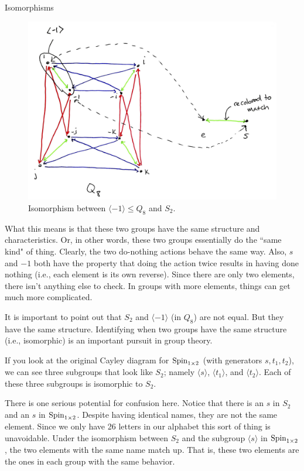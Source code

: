 \begin{section}{Isomorphisms}
\begin{figure}\label{fig:isoS2}
\begin{center}
\includegraphics[width=5in]{isoS2.png}
\end{center}
\caption{Isomorphism between $\langle -1\rangle\leq Q_8$ and $S_2$.}
\end{figure}

What this means is that these two groups have the same structure and characteristics.  Or, in other words, these two groups essentially do the ``same kind" of thing.  Clearly, the two do-nothing actions behave the same way.  Also, $s$ and $-1$ both have the property that doing the action twice results in having done nothing (i.e., each element is its own reverse).  Since there are only two elements, there isn't anything else to check.  In groups with more elements, things can get much more complicated.  

It is important to point out that $S_2$ and $\langle -1\rangle$ (in $Q_8$) are not equal.  But they have the same structure.  Identifying when two groups have the same structure (i.e., isomorphic) is an important pursuit in group theory.

If you look at the original Cayley diagram for $\operatorname{Spin}_{1\times 2}$ (with generators $s, t_1, t_2$), we can see three subgroups that look like $S_2$; namely $\langle s\rangle$, $\langle t_1\rangle$, and $\langle t_2\rangle$.  Each of these three subgroups is isomorphic to $S_2$.  

There is one serious potential for confusion here.  Notice that there is an $s$ in $S_2$ and an $s$ in $\operatorname{Spin}_{1\times 2}$.  Despite having identical names, they are not the same element.  Since we only have 26 letters in our alphabet this sort of thing is unavoidable.  Under the isomorphism between $S_2$ and the subgroup $\langle s\rangle$ in $\operatorname{Spin}_{1\times 2}$, the two elements with the same name match up.  That is, these two elements are the ones in each group with the same behavior.


\end{section}
